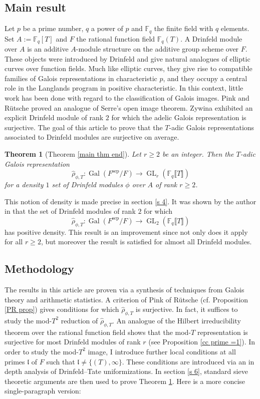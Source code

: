 \documentclass[11pt]{amsart}
\newtheorem{lthm}{Theorem}
\newcommand{\F}{\mathbb{F}}
\newcommand{\op}[1]{\operatorname{#1}}
\numberwithin{equation}{section}
\begin{document}
\subsection{Main result}
\par Let $p$ be a prime number, $q$ a power of $p$ and $\F_q$ the finite field with $q$ elements. Set $A:=\F_q[T]$ and $F$ the rational function field $\F_q(T)$. A Drinfeld module over $A$ is an additive $A$-module structure on the additive group scheme over $F$. These objects were introduced by Drinfeld and give natural analogues of elliptic curves over function fields. Much like elliptic curves, they give rise to compatible families of Galois representations in characteristic $p$, and they occupy a central role in the Langlands program in positive characteristic. In this context, little work has been done with regard to the classification of Galois images. Pink and R\"utsche \cite{pinkrutsche} proved an analogue of Serre's open image theorem. Zywina \cite{zywina2011drinfeld} exhibited an explicit Drinfeld module of rank $2$ for which the adelic Galois representation is surjective. The goal of this article to prove that the $T$-adic Galois representations associated to Drinfeld modules are surjective on average.
\begin{lthm}[Theorem \ref{main thm end}]\label{main thm}
    Let $r\geq 2$ be an integer. Then the $T$-adic Galois representation 
    \[\hat{\rho}_{\phi, T}:\op{Gal}(F^{\op{sep}}/F)\rightarrow \op{GL}_r(\F_q\llbracket T\rrbracket)\]
    for a density $1$ set of Drinfeld modules $\phi$ over $A$ of rank $r\geq 2$. 
\end{lthm}
This notion of density is made precise in section \ref{s 4}. It was shown by the author in \cite{raytadic} that the set of Drinfeld modules of rank $2$ for which \[\hat{\rho}_{\phi, T}:\op{Gal}(F^{\op{sep}}/F)\rightarrow \op{GL}_2(\F_q\llbracket T\rrbracket)\]
has positive density. This result is an improvement since not only does it apply for all $r\geq 2$, but moreover the result is satisfied for almost all Drinfeld modules.

\subsection{Methodology}
\par The results in this article are proven via a synthesis of techniques from Galois theory and arithmetic statistics. A criterion of Pink of R\"utsche (cf. Proposition \ref{PR prop}) gives conditions for which $\hat{\rho}_{\phi, T}$ is surjective. In fact, it suffices to study the mod-$T^2$ reduction of $\hat{\rho}_{\phi, T}$. An analogue of the Hilbert irreducibility theorem over the rational function field \cite[Corollary 3.5]{HITFF} shows that the mod-$T$ representation is surjective for most Drinfeld modules of rank $r$ (see Proposition \ref{cc prime =1}). In order to study the mod-$T^2$ image, I introduce further local conditions at all primes $\mathfrak{l}$ of $F$ such that $\mathfrak{l}\neq \{(T), \infty\}$. These conditions are introduced via an in depth analysis of Drinfeld--Tate uniformizations. In section \ref{s 6}, standard sieve theoretic arguments are then used to prove Theorem \ref{main thm}. Here is a more concise single-paragraph version:
\end{document}
